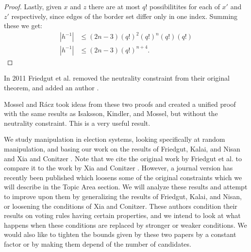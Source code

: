 \begin{proof}
		Lastly, given $x$ and $z$ there are at most $q!$ possibilitites for each of $x'$ and $z'$ respectively, since edges of the border set differ only in one index. Summing these we get:
		\begin{align*}
			|h^{-1}| &\le (2n - 3)(q!)^2(q!)^n(q!)(q!) \\
			|h^{-1}| &\le (2n - 3)(q!)^{n+4}.
		\end{align*}

	\end{proof}

	In 2011 Friedgut et al. removed the neutrality constraint from their original theorem, and added an author \cite{friedgut2011quantitative}.

	Mossel and R\'{a}cz \cite{mossel2011quantitative} took ideas from these two proofs and created a unified proof with the same results as Isaksson, Kindler, and Mossel, but without the neutrality constraint. This is a very useful result.

























We study manipulation in election systems, looking specifically at random manipulation, and basing our work on the results of Friedgut, Kalai, and Nisan \cite{friedgut2008elections} and Xia and Conitzer \cite{xia2008sufficient}. Note that we cite the original work by Friedgut et al. \cite{friedgut2008elections} to compare it to the work by Xia and Conitzer \cite{xia2008sufficient}. However, a journal version has recently been published which loosens some of the original constraints \cite{friedgut2011quantitative} which we will describe in the Topic Area section. We will analyze these results and attempt to improve upon them by generalizing the results of Friedgut, Kalai, and Nisan, or loosening the conditions of Xia and Conitzer.  These authors condition their results on voting rules having certain properties, and we intend to look at what happens when these conditions are replaced by stronger or weaker conditions. We would also like to tighten the bounds given by these two papers by a constant factor or by making them depend of the number of candidates.

